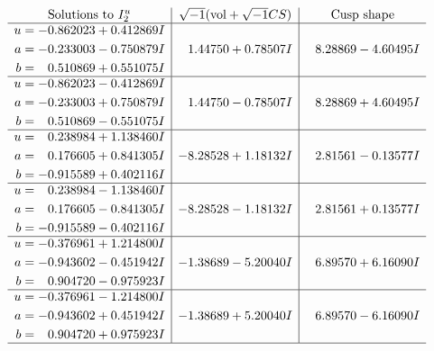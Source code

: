 \documentclass[1p]{elsarticle_modified}
\theoremstyle{definition}
\newcommand{\I}{\sqrt{-1}}
\begin{document}
$$\begin{array}{c|c|c}  
\text{Solutions to }I^u_{2}& \I (\text{vol} + \sqrt{-1}CS) & \text{Cusp shape}\\
 \hline 
\begin{aligned}
u &= -0.862023 + 0.412869 I \\
a &= -0.233003 - 0.750879 I \\
b &= \phantom{-}0.510869 + 0.551075 I\end{aligned}
 & \phantom{-}1.44750 + 0.78507 I & \phantom{-}8.28869 - 4.60495 I \\ \hline\begin{aligned}
u &= -0.862023 - 0.412869 I \\
a &= -0.233003 + 0.750879 I \\
b &= \phantom{-}0.510869 - 0.551075 I\end{aligned}
 & \phantom{-}1.44750 - 0.78507 I & \phantom{-}8.28869 + 4.60495 I \\ \hline\begin{aligned}
u &= \phantom{-}0.238984 + 1.138460 I \\
a &= \phantom{-}0.176605 + 0.841305 I \\
b &= -0.915589 + 0.402116 I\end{aligned}
 & -8.28528 + 1.18132 I & \phantom{-}2.81561 - 0.13577 I \\ \hline\begin{aligned}
u &= \phantom{-}0.238984 - 1.138460 I \\
a &= \phantom{-}0.176605 - 0.841305 I \\
b &= -0.915589 - 0.402116 I\end{aligned}
 & -8.28528 - 1.18132 I & \phantom{-}2.81561 + 0.13577 I \\ \hline\begin{aligned}
u &= -0.376961 + 1.214800 I \\
a &= -0.943602 - 0.451942 I \\
b &= \phantom{-}0.904720 - 0.975923 I\end{aligned}
 & -1.38689 - 5.20040 I & \phantom{-}6.89570 + 6.16090 I \\ \hline\begin{aligned}
u &= -0.376961 - 1.214800 I \\
a &= -0.943602 + 0.451942 I \\
b &= \phantom{-}0.904720 + 0.975923 I\end{aligned}
 & -1.38689 + 5.20040 I & \phantom{-}6.89570 - 6.16090 I\\
 \hline 
 \end{array}$$\newpage\newpage\renewcommand{\arraystretch}{1}
\end{document}
